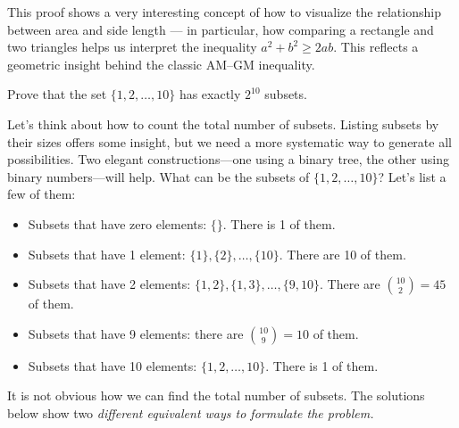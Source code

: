 \documentclass{article}
\begin{document}
\begin{remark*}
    This proof shows a very interesting concept of how to visualize the relationship between area and side length — in particular, how comparing a rectangle and two triangles helps us interpret the inequality \( a^2 + b^2 \geq 2ab \).  
    This reflects a geometric insight behind the classic AM–GM inequality.
\end{remark*}

\begin{example}\label{example:subset-binary-tree}
    Prove that the set \( \{1, 2, \dots, 10\} \) has exactly \( 2^{10} \) subsets.
       
\end{example}

\begin{analysis*}
    Let’s think about how to count the total number of subsets. Listing subsets by their sizes offers some insight, but we need a more systematic way to generate all possibilities. Two elegant constructions—one using a binary tree, the other using binary numbers—will help.
    What can be the subsets of \( \{1, 2, \dots, 10\} \)? Let’s list a few of them:
    \begin{itemize}[topsep=0pt, itemsep=2pt]
        \item Subsets that have zero elements: \( \{\} \). There is 1 of them.
        \item Subsets that have 1 element: \( \{1\}, \{2\}, \dots, \{10\} \). There are 10 of them.
        \item Subsets that have 2 elements: \( \{1,2\}, \{1,3\}, \dots, \{9,10\} \). There are \( \binom{10}{2} = 45 \) of them.
        \item Subsets that have 9 elements: there are \( \binom{10}{9} = 10 \) of them.
        \item Subsets that have 10 elements: \( \{1, 2, \dots, 10\} \). There is 1 of them.
    \end{itemize}

    It is not obvious how we can find the total number of subsets. The solutions below show two \textit{different equivalent ways to formulate the problem.}
\end{analysis*}
\end{document}
